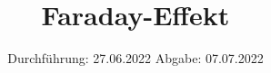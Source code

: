 

\subject{V46}
\title{Faraday-Effekt}
\date{%
  Durchführung: 27.06.2022
  \hspace{3em}
  Abgabe: 07.07.2022
}



\maketitle
\thispagestyle{empty}
\tableofcontents
\newpage






\printbibliography{}


